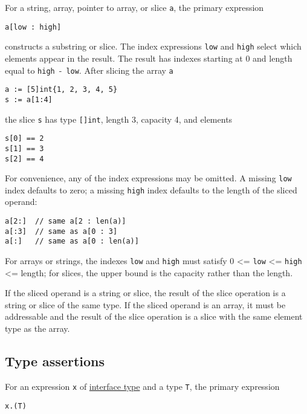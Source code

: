 {For a string, array, pointer to array, or slice \texttt{a}, the primary
expression

\begin{Verbatim}[frame=single]
a[low : high]
\end{Verbatim}

constructs a substring or slice. The index expressions \texttt{low} and
\texttt{high} select which elements appear in the result. The result has
indexes starting at 0 and length equal to \texttt{high}~-~\texttt{low}.
After slicing the array \texttt{a}

\begin{Verbatim}[frame=single]
a := [5]int{1, 2, 3, 4, 5}
s := a[1:4]
\end{Verbatim}

the slice \texttt{s} has type \texttt{{[}{]}int}, length 3, capacity 4,
and elements

\begin{Verbatim}[frame=single]
s[0] == 2
s[1] == 3
s[2] == 4
\end{Verbatim}

For convenience, any of the index expressions may be omitted. A missing
\texttt{low} index defaults to zero; a missing \texttt{high} index
defaults to the length of the sliced operand:

\begin{Verbatim}[frame=single]
a[2:]  // same a[2 : len(a)]
a[:3]  // same as a[0 : 3]
a[:]   // same as a[0 : len(a)]
\end{Verbatim}

For arrays or strings, the indexes \texttt{low} and \texttt{high} must
satisfy 0 \textless{}= \texttt{low} \textless{}= \texttt{high}
\textless{}= length; for slices, the upper bound is the capacity rather
than the length.

If the sliced operand is a string or slice, the result of the slice
operation is a string or slice of the same type. If the sliced operand
is an array, it must be addressable and
the result of the slice operation is a slice with the same element type
as the array.

\subsection*{Type assertions}

For an expression \texttt{x} of \hyperref[Interface\_types]{interface
type} and a type \texttt{T}, the primary expression

\begin{Verbatim}[frame=single]
x.(T)
\end{Verbatim}

}

